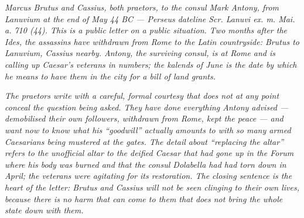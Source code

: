 
\textit{Marcus Brutus and Cassius, both praetors, to the consul
Mark Antony, from Lanuvium at the end of May 44 BC --- Perseus
dateline \textit{Scr. Lanuvi ex. m. Mai. a. 710 (44)}. This is
a public letter on a public situation. Two months after the
Ides, the assassins have withdrawn from Rome to the Latin
countryside: Brutus to Lanuvium, Cassius nearby. Antony, the
surviving consul, is at Rome and is calling up Caesar's
veterans in numbers; the kalends of June is the date by which
he means to have them in the city for a bill of land grants.}

\textit{The praetors write with a careful, formal courtesy that
does not at any point conceal the question being asked. They
have done everything Antony advised --- demobilised their own
followers, withdrawn from Rome, kept the peace --- and want now
to know what his ``goodwill'' actually amounts to with so many
armed Caesarians being mustered at the gates. The detail about
``replacing the altar'' refers to the unofficial altar to the
deified Caesar that had gone up in the Forum where his body
was burned and that the consul Dolabella had had torn down in
April; the veterans were agitating for its restoration. The
closing sentence is the heart of the letter: Brutus and Cassius
will not be seen clinging to their own lives, because there is
no harm that can come to them that does not bring the whole
state down with them.}
